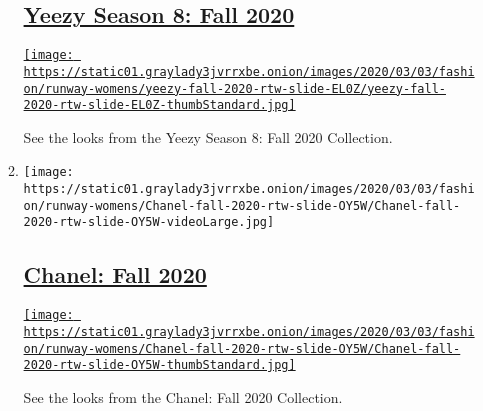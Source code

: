 \begin{enumerate}
\begin{enumerate}
    \hypertarget{yeezy-season-8-fall-2020}{%
    \subsection{\texorpdfstring{\href{/slideshow/2020/03/03/fashion/runway-womens/yeezy-season-8-fall-2020.html}{Yeezy
    Season 8: Fall
    2020}}{Yeezy Season 8: Fall 2020}}\label{yeezy-season-8-fall-2020}}

    \href{/slideshow/2020/03/03/fashion/runway-womens/yeezy-season-8-fall-2020.html}{\texttt{[image: https://static01.graylady3jvrrxbe.onion/images/2020/03/03/fashion/runway-womens/yeezy-fall-2020-rtw-slide-EL0Z/yeezy-fall-2020-rtw-slide-EL0Z-thumbStandard.jpg]}}

    See the looks from the Yeezy Season 8: Fall 2020 Collection.
  \item
    \texttt{[image: https://static01.graylady3jvrrxbe.onion/images/2020/03/03/fashion/runway-womens/Chanel-fall-2020-rtw-slide-OY5W/Chanel-fall-2020-rtw-slide-OY5W-videoLarge.jpg]}

    \hypertarget{chanel-fall-2020}{%
    \subsection{\texorpdfstring{\href{/slideshow/2020/03/03/fashion/runway-womens/chanel-fall-2020.html}{Chanel:
    Fall 2020}}{Chanel: Fall 2020}}\label{chanel-fall-2020}}

    \href{/slideshow/2020/03/03/fashion/runway-womens/chanel-fall-2020.html}{\texttt{[image: https://static01.graylady3jvrrxbe.onion/images/2020/03/03/fashion/runway-womens/Chanel-fall-2020-rtw-slide-OY5W/Chanel-fall-2020-rtw-slide-OY5W-thumbStandard.jpg]}}

    See the looks from the Chanel: Fall 2020 Collection.
  \end{enumerate}
\end{enumerate}

